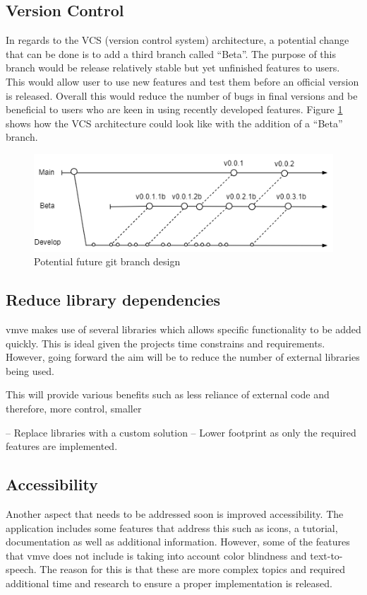 \documentclass[11pt]{article}
\begin{document}
\subsection{Version Control}
In regards to the VCS (version control system) architecture, a potential change
that can be done is to add a third branch called ``Beta''. The purpose of this
branch would be release relatively stable but yet unfinished features to users.
This would allow user to use new features and test them before an official
version is released. Overall this would reduce the number of bugs in final
versions and be beneficial to users who are keen in using recently developed
features. Figure \ref{fig:futurebrancharch} shows how the VCS architecture could
look like with the addition of a ``Beta'' branch.

\begin{figure}[h!]
  \centering
  \includegraphics[width=\textwidth]{images/future_branch_design.png}
  \caption{Potential future git branch design}
  \label{fig:futurebrancharch}
\end{figure}

\subsection{Reduce library dependencies}
\gls{vmve} makes use of several libraries which allows specific functionality to be
added quickly. This is ideal given the projects time constrains and
requirements. However, going forward the aim will be to reduce the number of
external libraries being used.

This will provide various benefits such as less reliance of external code and
therefore, more control, smaller 


-- Replace libraries with a custom solution --
Lower footprint as only the required features are implemented.

\subsection{Accessibility}
Another aspect that needs to be addressed soon is improved accessibility. The
application includes some features that address this such as icons, a tutorial,
documentation as well as additional information. However, some of the features
that \gls{vmve} does not include is taking into account color blindness and
text-to-speech. The reason for this is that these are more complex topics and
required additional time and research to ensure a proper implementation is
released.
\end{document}
